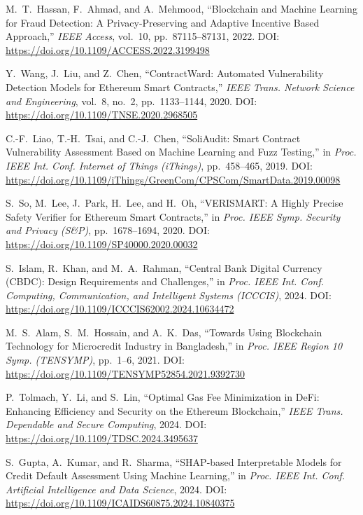 \documentclass[12pt,a4paper]{report}
\begin{document}
{\begin{enumerate}[label={[\arabic*]}]
\item M.~T.~Hassan, F.~Ahmad, and A.~Mehmood, ``Blockchain and Machine Learning for Fraud Detection: A Privacy-Preserving and Adaptive Incentive Based Approach,'' \textit{IEEE Access}, vol.~10, pp.~87115--87131, 2022. DOI: \url{https://doi.org/10.1109/ACCESS.2022.3199498}

\item Y.~Wang, J.~Liu, and Z.~Chen, ``ContractWard: Automated Vulnerability Detection Models for Ethereum Smart Contracts,'' \textit{IEEE Trans. Network Science and Engineering}, vol.~8, no.~2, pp.~1133--1144, 2020. DOI: \url{https://doi.org/10.1109/TNSE.2020.2968505}

\item C.-F.~Liao, T.-H.~Tsai, and C.-J.~Chen, ``SoliAudit: Smart Contract Vulnerability Assessment Based on Machine Learning and Fuzz Testing,'' in \textit{Proc. IEEE Int. Conf. Internet of Things (iThings)}, pp.~458--465, 2019. DOI: \url{https://doi.org/10.1109/iThings/GreenCom/CPSCom/SmartData.2019.00098}

\item S.~So, M.~Lee, J.~Park, H.~Lee, and H.~Oh, ``VERISMART: A Highly Precise Safety Verifier for Ethereum Smart Contracts,'' in \textit{Proc. IEEE Symp. Security and Privacy (S\&P)}, pp.~1678--1694, 2020. DOI: \url{https://doi.org/10.1109/SP40000.2020.00032}

\item S.~Islam, R.~Khan, and M.~A.~Rahman, ``Central Bank Digital Currency (CBDC): Design Requirements and Challenges,'' in \textit{Proc. IEEE Int. Conf. Computing, Communication, and Intelligent Systems (ICCCIS)}, 2024. DOI: \url{https://doi.org/10.1109/ICCCIS62002.2024.10634472}

\item M.~S.~Alam, S.~M.~Hossain, and A.~K.~Das, ``Towards Using Blockchain Technology for Microcredit Industry in Bangladesh,'' in \textit{Proc. IEEE Region 10 Symp. (TENSYMP)}, pp.~1--6, 2021. DOI: \url{https://doi.org/10.1109/TENSYMP52854.2021.9392730}

\item P.~Tolmach, Y.~Li, and S.~Lin, ``Optimal Gas Fee Minimization in DeFi: Enhancing Efficiency and Security on the Ethereum Blockchain,'' \textit{IEEE Trans. Dependable and Secure Computing}, 2024. DOI: \url{https://doi.org/10.1109/TDSC.2024.3495637}

\item S.~Gupta, A.~Kumar, and R.~Sharma, ``SHAP-based Interpretable Models for Credit Default Assessment Using Machine Learning,'' in \textit{Proc. IEEE Int. Conf. Artificial Intelligence and Data Science}, 2024. DOI: \url{https://doi.org/10.1109/ICAIDS60875.2024.10840375}
\end{enumerate}
}
\end{document}
